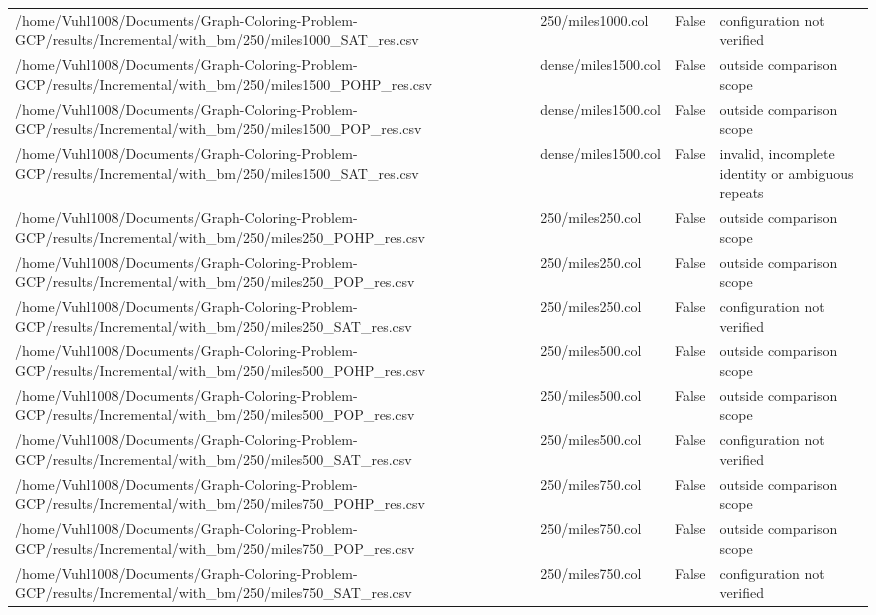 \begin{table}[htbp]
\begin{tabular}{llll}
/home/Vuhl1008/Documents/Graph-Coloring-Problem-GCP/results/Incremental/with\_bm/250/miles1000\_SAT\_res.csv & 250/miles1000.col & False & configuration not verified \\
/home/Vuhl1008/Documents/Graph-Coloring-Problem-GCP/results/Incremental/with\_bm/250/miles1500\_POHP\_res.csv & dense/miles1500.col & False & outside comparison scope \\
/home/Vuhl1008/Documents/Graph-Coloring-Problem-GCP/results/Incremental/with\_bm/250/miles1500\_POP\_res.csv & dense/miles1500.col & False & outside comparison scope \\
/home/Vuhl1008/Documents/Graph-Coloring-Problem-GCP/results/Incremental/with\_bm/250/miles1500\_SAT\_res.csv & dense/miles1500.col & False & invalid, incomplete identity or ambiguous repeats \\
/home/Vuhl1008/Documents/Graph-Coloring-Problem-GCP/results/Incremental/with\_bm/250/miles250\_POHP\_res.csv & 250/miles250.col & False & outside comparison scope \\
/home/Vuhl1008/Documents/Graph-Coloring-Problem-GCP/results/Incremental/with\_bm/250/miles250\_POP\_res.csv & 250/miles250.col & False & outside comparison scope \\
/home/Vuhl1008/Documents/Graph-Coloring-Problem-GCP/results/Incremental/with\_bm/250/miles250\_SAT\_res.csv & 250/miles250.col & False & configuration not verified \\
/home/Vuhl1008/Documents/Graph-Coloring-Problem-GCP/results/Incremental/with\_bm/250/miles500\_POHP\_res.csv & 250/miles500.col & False & outside comparison scope \\
/home/Vuhl1008/Documents/Graph-Coloring-Problem-GCP/results/Incremental/with\_bm/250/miles500\_POP\_res.csv & 250/miles500.col & False & outside comparison scope \\
/home/Vuhl1008/Documents/Graph-Coloring-Problem-GCP/results/Incremental/with\_bm/250/miles500\_SAT\_res.csv & 250/miles500.col & False & configuration not verified \\
/home/Vuhl1008/Documents/Graph-Coloring-Problem-GCP/results/Incremental/with\_bm/250/miles750\_POHP\_res.csv & 250/miles750.col & False & outside comparison scope \\
/home/Vuhl1008/Documents/Graph-Coloring-Problem-GCP/results/Incremental/with\_bm/250/miles750\_POP\_res.csv & 250/miles750.col & False & outside comparison scope \\
/home/Vuhl1008/Documents/Graph-Coloring-Problem-GCP/results/Incremental/with\_bm/250/miles750\_SAT\_res.csv & 250/miles750.col & False & configuration not verified \\

\end{tabular}
\end{table}
